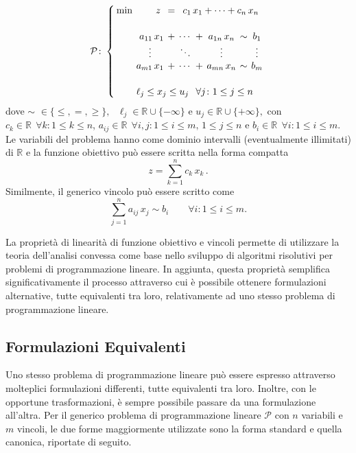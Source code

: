 \begin{equation}
\mathcal{P}\colon
\setlength{\arraycolsep}{2pt}
\left\{\begin{array}{rrcccccc}
\min & z\,\, &=& \multicolumn{5}{c}{c_{1}\,x_{1}+\cdots+c_{n}\,x_{n}} \\[15pt]
     &  a_{11}\,x_{1} &+ &\cdots &+ &a_{1n}\,x_{n} &\sim &b_{1}       \\
     & \multicolumn{1}{c}{\vdots} &&\ddots&&\vdots&& \vdots           \\
     &  a_{m1}\,x_{1} &+ &\cdots &+ &a_{mn}\,x_{n} &\sim &b_{m}       \\[15pt]
     & \multicolumn{7}{l}{\ell_j \le x_{j} \le u_{j} \;\;\, \forall j\colon
     1 \le j \le n}
\end{array}\right.\\[10pt]
\end{equation}
dove
\(
\sim \,\,\in \{ \leq, =, \geq \}, \text{ } \ell_j \in \mathbb{R} \cup \{-\infty\} \text{ e } u_j \in \mathbb{R} \cup
\{+\infty\},
\)
con \( c_k \in \mathbb{R} \;\, \forall k\colon 1 \leq k \leq n \), \( a_{ij} \in \mathbb{R} \;\, \forall i,j\colon 1
\leq i \leq m,\, 1 \leq j \leq n \) e \( b_i \in \mathbb{R}\;\, \forall i\colon 1 \leq i \leq m \). Le variabili del
problema hanno come dominio intervalli (eventualmente illimitati) di \( \mathbb{R} \) e la funzione obiettivo può essere
scritta nella forma compatta
\begin{equation}
    z = \sum_{k = 1}^n c_k\,x_k\,.
\end{equation}
Similmente, il generico vincolo può essere scritto come
\begin{equation}
    \sum_{j = 1}^n a_{ij}\, x_j \sim b_i \qquad \forall i\colon 1 \leq i \leq m.
\end{equation}

La proprietà di linearità di funzione obiettivo e vincoli permette di utilizzare la teoria dell'analisi convessa come
base nello sviluppo di algoritmi risolutivi per problemi di programmazione lineare. In aggiunta, questa proprietà
semplifica significativamente il processo attraverso cui è possibile ottenere formulazioni alternative, tutte
equivalenti tra loro, relativamente ad uno stesso problema di programmazione lineare.

\subsection{Formulazioni Equivalenti}
Uno stesso problema di programmazione lineare può essere espresso attraverso molteplici formulazioni differenti, tutte
equivalenti tra loro. Inoltre, con le opportune trasformazioni, è sempre possibile passare da una formulazione
all'altra. Per il generico problema di programmazione lineare
\(
    \mathcal{P}
\)
con \( n \) variabili e \( m \) vincoli, le due forme maggiormente utilizzate sono la forma standard e quella canonica,
riportate di seguito.

